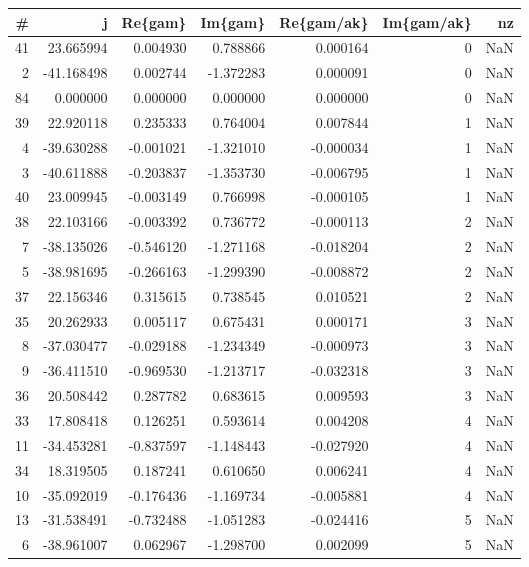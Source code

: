 \begin{tabular}{rrrrrrr}
\toprule
 \# &          j &    Re\{gam\} &   Im\{gam\} &  Re\{gam/ak\} &  Im\{gam/ak\} &  nz \\
\midrule
41 &  23.665994 &   0.004930 &  0.788866 &    0.000164 &           0 & NaN \\
 2 & -41.168498 &   0.002744 & -1.372283 &    0.000091 &           0 & NaN \\
84 &   0.000000 &   0.000000 &  0.000000 &    0.000000 &           0 & NaN \\
39 &  22.920118 &   0.235333 &  0.764004 &    0.007844 &           1 & NaN \\
 4 & -39.630288 &  -0.001021 & -1.321010 &   -0.000034 &           1 & NaN \\
 3 & -40.611888 &  -0.203837 & -1.353730 &   -0.006795 &           1 & NaN \\
40 &  23.009945 &  -0.003149 &  0.766998 &   -0.000105 &           1 & NaN \\
38 &  22.103166 &  -0.003392 &  0.736772 &   -0.000113 &           2 & NaN \\
 7 & -38.135026 &  -0.546120 & -1.271168 &   -0.018204 &           2 & NaN \\
 5 & -38.981695 &  -0.266163 & -1.299390 &   -0.008872 &           2 & NaN \\
37 &  22.156346 &   0.315615 &  0.738545 &    0.010521 &           2 & NaN \\
35 &  20.262933 &   0.005117 &  0.675431 &    0.000171 &           3 & NaN \\
 8 & -37.030477 &  -0.029188 & -1.234349 &   -0.000973 &           3 & NaN \\
 9 & -36.411510 &  -0.969530 & -1.213717 &   -0.032318 &           3 & NaN \\
36 &  20.508442 &   0.287782 &  0.683615 &    0.009593 &           3 & NaN \\
33 &  17.808418 &   0.126251 &  0.593614 &    0.004208 &           4 & NaN \\
11 & -34.453281 &  -0.837597 & -1.148443 &   -0.027920 &           4 & NaN \\
34 &  18.319505 &   0.187241 &  0.610650 &    0.006241 &           4 & NaN \\
10 & -35.092019 &  -0.176436 & -1.169734 &   -0.005881 &           4 & NaN \\
13 & -31.538491 &  -0.732488 & -1.051283 &   -0.024416 &           5 & NaN \\
 6 & -38.961007 &   0.062967 & -1.298700 &    0.002099 &           5 & NaN \\

\end{tabular}
